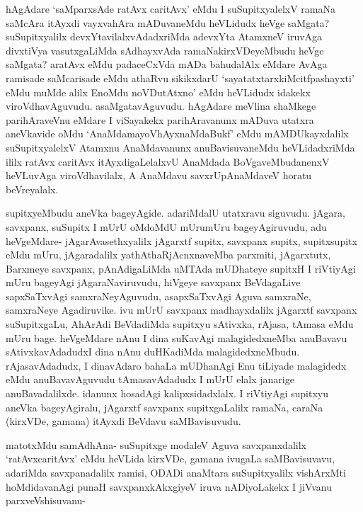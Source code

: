 \begin{artha}
hAgAdare `saMparxsAde ratAvx caritAvx' eMdu I suSupitxyalelxV ramaNa saMcAra itAyxdi vayxvahAra mADuvaneMdu heVLidudx heVge saMgata? suSupitxyalilx devxYtavilalxvAdadxriMda adevxYta AtamxneV iruvAga divxtiVya vasutxgaLiMda sAdhayxvAda ramaNakirxVDeyeMbudu heVge saMgata? aratAvx eMdu padaceCxVda mADa bahudalAlx eMdare AvAga ramisade saMcarisade eMdu athaRvu sikikxdarU `sayatatxtarxkiMcitfpashayxti' eMdu muMde alilx EnoMdu noVDutAtxno' eMdu heVLidudx idakekx viroVdhavAguvudu. asaMgatavAguvudu. hAgAdare meVlina shaMkege parihAraveVnu eMdare I viSayakekx parihAravanunx mADuva utatxra aneVkavide oMdu `AnaMdamayoVhAyxnaMdaBukf' eMdu mAMDUkayxdalilx suSupitxyalelxV Atamxnu AnaMdavanunx anuBavisuvaneMdu heVLidadxriMda ililx ratAvx caritAvx itAyxdigaLelalxvU AnaMdada BoVgaveMbudanenxV heVLuvAga viroVdhavilalx, A AnaMdavu savxrUpAnaMdaveV horatu beVreyalalx. 
\end{artha}%


\begin{artha}
supitxyeMbudu aneVka bageyAgide. adariMdalU utatxravu siguvudu. jAgara, savxpanx, suSupitx I mUrU oMdoMdU mUrumUru bageyAgiruvudu, adu heVgeMdare- jAgarAvasethxyalilx jAgarxtf supitx, savxpanx supitx, supitxsupitx eMdu mUru, jAgaradalilx yathAthaRjAcnxnaveMba parxmiti, jAgarxtutx, Barxmeye savxpanx, pAnAdigaLiMda uMTAda mUDhateye supitxH I riVtiyAgi mUru bageyAgi jAgaraNaviruvudu, hiVgeye savxpanx BeVdagaLive sapxSaTxvAgi samxraNeyAguvudu, asapxSaTxvAgi Aguva samxraNe, samxraNeye Agadiruvike. ivu mUrU savxpanx madhayxdalilx jAgarxtf savxpanx suSupitxgaLu, AhArAdi BeVdadiMda supitxyu sAtivxka, rAjasa, tAmasa eMdu mUru bage. heVgeMdare nAnu I dina suKavAgi malagidedxneMba anuBavavu sAtivxkavAdadudxI dina nAnu duHKadiMda malagidedxneMbudu. rAjasavAdadudx, I dinavAdaro bahaLa mUDhanAgi Enu tiLiyade malagidedx eMdu anuBavavAguvudu tAmasavAdadudx I mUrU elalx janarige anuBavadalilxde. idanunx hosadAgi kalipxsidadxlalx. I riVtiyAgi supitxyu aneVka bageyAgiralu, jAgarxtf savxpanx supitxgaLalilx ramaNa, caraNa (kirxVDe, gamana) itAyxdi BeVdavu saMBavisuvudu.
\end{artha}

\begin{artha}
matotxMdu samAdhAna- suSupitxge modaleV Aguva savxpanxdalilx `ratAvxcaritAvx' eMdu heVLida kirxVDe, gamana ivugaLa saMBavisuvavu, adariMda savxpanadalilx ramisi, ODADi anaMtara suSupitxyalilx vishArxMti hoMdidavanAgi punaH savxpanxkAkxgiyeV iruva nADiyoLakekx I jiVvanu parxveVshisuvanu-
\end{artha}%

